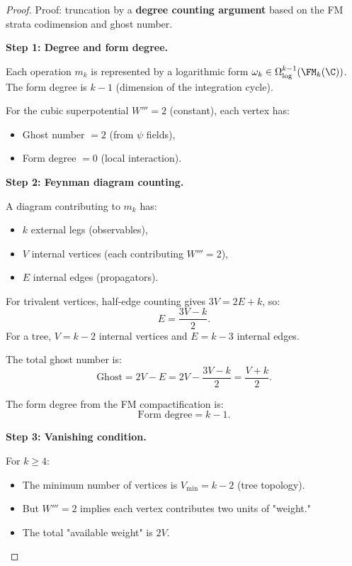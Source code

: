 \begin{proof}
Proof: truncation by a \textbf{degree counting argument} based on the FM strata codimension and ghost number.

\textbf{Step 1: Degree and form degree.}

Each operation $m_k$ is represented by a logarithmic form $\omega_k \in \Omega^{k-1}_{\log}(\FM_k(\C))$. The form degree is $k-1$ (dimension of the integration cycle).

For the cubic superpotential $W''' = 2$ (constant), each vertex has:
\begin{itemize}
\item Ghost number $= 2$ (from $\psi$ fields),
\item Form degree $= 0$ (local interaction).
\end{itemize}

\textbf{Step 2: Feynman diagram counting.}

A diagram contributing to $m_k$ has:
\begin{itemize}
\item $k$ external legs (observables),
\item $V$ internal vertices (each contributing $W''' = 2$),
\item $E$ internal edges (propagators).
\end{itemize}

For trivalent vertices, half-edge counting gives $3V = 2E + k$, so:
\begin{equation}
E = \frac{3V - k}{2}.
\end{equation}
For a tree, $V = k - 2$ internal vertices and $E = k - 3$ internal edges.

The total ghost number is:
\begin{equation}
\text{Ghost} = 2V - E = 2V - \frac{3V-k}{2} = \frac{V + k}{2}.
\end{equation}

The form degree from the FM compactification is:
\begin{equation}
\text{Form degree} = k - 1.
\end{equation}

\textbf{Step 3: Vanishing condition.}

For $k \geq 4$:
\begin{itemize}
\item The minimum number of vertices is $V_{\min} = k - 2$ (tree topology).
\item But $W''' = 2$ implies each vertex contributes two units of "weight."
\item The total "available weight" is $2V$.
\end{itemize}


\end{proof}
